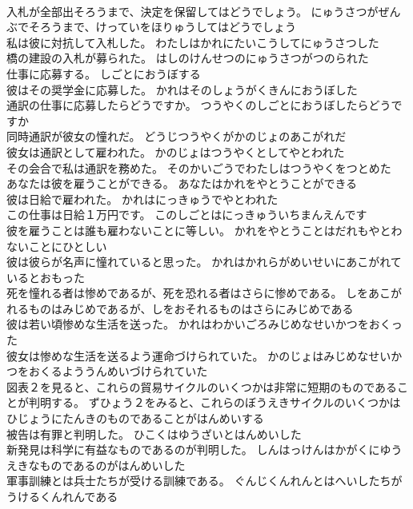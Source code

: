 \documentclass[8pt]{extreport}
\begin{document}
\begin{CJK}{UTF8}{min}
\\	入札が全部出そろうまで、決定を保留してはどうでしょう。	にゅうさつがぜんぶでそろうまで、けっていをほりゅうしてはどうでしょう 
\\	私は彼に対抗して入札した。	わたしはかれにたいこうしてにゅうさつした 
\\	橋の建設の入札が募られた。	はしのけんせつのにゅうさつがつのられた 
\\	仕事に応募する。	しごとにおうぼする 
\\	彼はその奨学金に応募した。	かれはそのしょうがくきんにおうぼした 
\\	通訳の仕事に応募したらどうですか。	つうやくのしごとにおうぼしたらどうですか 
\\	同時通訳が彼女の憧れだ。	どうじつうやくがかのじょのあこがれだ 
\\	彼女は通訳として雇われた。	かのじょはつうやくとしてやとわれた 
\\	その会合で私は通訳を務めた。	そのかいごうでわたしはつうやくをつとめた 
\\	あなたは彼を雇うことができる。	あなたはかれをやとうことができる 
\\	彼は日給で雇われた。	かれはにっきゅうでやとわれた 
\\	この仕事は日給１万円です。	このしごとはにっきゅういちまんえんです 
\\	彼を雇うことは誰も雇わないことに等しい。	かれをやとうことはだれもやとわないことにひとしい 
\\	彼は彼らが名声に憧れていると思った。	かれはかれらがめいせいにあこがれているとおもった 
\\	死を憧れる者は惨めであるが、死を恐れる者はさらに惨めである。	しをあこがれるものはみじめであるが、しをおそれるものはさらにみじめである 
\\	彼は若い頃惨めな生活を送った。	かれはわかいごろみじめなせいかつをおくった 
\\	彼女は惨めな生活を送るよう運命づけられていた。	かのじょはみじめなせいかつをおくるよううんめいづけられていた 
\\	図表２を見ると、これらの貿易サイクルのいくつかは非常に短期のものであることが判明する。	ずひょう２をみると、これらのぼうえきサイクルのいくつかはひじょうにたんきのものであることがはんめいする 
\\	被告は有罪と判明した。	ひこくはゆうざいとはんめいした 
\\	新発見は科学に有益なものであるのが判明した。	しんはっけんはかがくにゆうえきなものであるのがはんめいした 
\\	軍事訓練とは兵士たちが受ける訓練である。	ぐんじくんれんとはへいしたちがうけるくんれんである 

\end{CJK}
\end{document}
